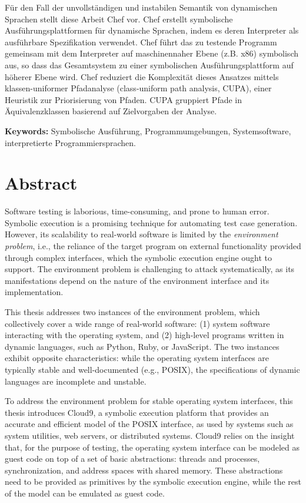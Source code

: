 \documentclass[letterpaper,10pt,oneside]{book}
\begin{document}
Für den Fall der unvollständigen und instabilen Semantik von dynamischen Sprachen stellt diese Arbeit Chef vor. Chef erstellt symbolische Ausführungsplattformen für dynamische Sprachen, indem es deren Interpreter als ausführbare Spezifikation verwendet. Chef führt das zu testende Programm gemeinsam mit dem Interpreter auf maschinennaher Ebene (z.B. x86) symbolisch aus, so dass das Gesamtsystem zu einer symbolischen Ausführungsplattform auf höherer Ebene wird. Chef reduziert die Komplexität dieses Ansatzes mittels klassen-uniformer Pfadanalyse (class-uniform path analysis, CUPA), einer Heuristik zur Priorisierung von Pfaden. CUPA gruppiert Pfade in Äquivalenzklassen basierend auf Zielvorgaben der Analyse. 

\noindent \textbf{Keywords:} Symbolische Ausführung, Programmumgebungen, Systemsoftware, interpretierte Programmiersprachen.

\chapter*{Abstract}

Software testing is laborious, time-consuming, and prone to human error.  Symbolic execution is a promising technique for automating test case generation.  However, its scalability to real-world software is limited by the \emph{environment problem}, i.e., the reliance of the target program on external functionality provided through complex interfaces, which the symbolic execution engine ought to support.
%
The environment problem is challenging to attack systematically, as its manifestations depend on the nature of the environment interface and its implementation.

This thesis addresses two instances of the environment problem, which collectively cover a wide range of real-world software: (1) system software interacting with the operating system, and (2) high-level programs written in dynamic languages, such as Python, Ruby, or JavaScript.  The two instances exhibit opposite characteristics: while the operating system interfaces are typically stable and well-documented (e.g., POSIX), the specifications of dynamic languages are incomplete and unstable.

To address the environment problem for stable operating system interfaces, this thesis introduces Cloud9, a symbolic execution platform that provides an accurate and efficient model of the POSIX interface, as used by systems such as system utilities, web servers, or distributed systems.
%
Cloud9 relies on the insight that, for the purpose of testing, the operating system interface can be modeled as guest code on top of a set of basic abstractions: threads and processes, synchronization, and address spaces with shared memory. These abstractions need to be provided as primitives by the symbolic execution engine, while the rest of the model can be emulated as guest code.
\end{document}
